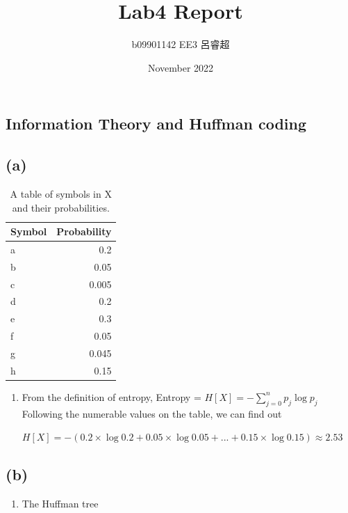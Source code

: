 \documentclass{article}
\title{Lab4 Report}
\author{b09901142 EE3 呂睿超}
\date{November 2022}
\begin{document}
\begin{CJK*}{UTF8}{bsmi}
\maketitle

\section{Information Theory and Huffman coding}
\subsection{(a)}
\begin{table}[h!]
\centering
\begin{tabular}{l|r}
Symbol & Probability \\\hline
a & 0.2 \\
b & 0.05 \\
c & 0.005 \\
d & 0.2 \\
e & 0.3 \\
f & 0.05 \\
g & 0.045 \\
h & 0.15 
\end{tabular}
\caption{\label{tab:widgets}A table of symbols in X and their probabilities.}
\end{table}

\begin{enumerate}
\item From the definition of entropy, Entropy = $H[X] = -\sum_{j=0}^{n} p_j \log{p_j}$
Following the numerable values on the table, we can find out 

$H[X] = -(0.2\times \log{0.2}+0.05\times \log{0.05}+...+0.15\times \log{0.15}) \approx 2.53 $
\end{enumerate}
\subsection{(b)}
\begin{enumerate}
    \item The Huffman tree 
\begin{figure}[H]
\end{figure}



\end{enumerate}
\end{CJK*}
\end{document}
